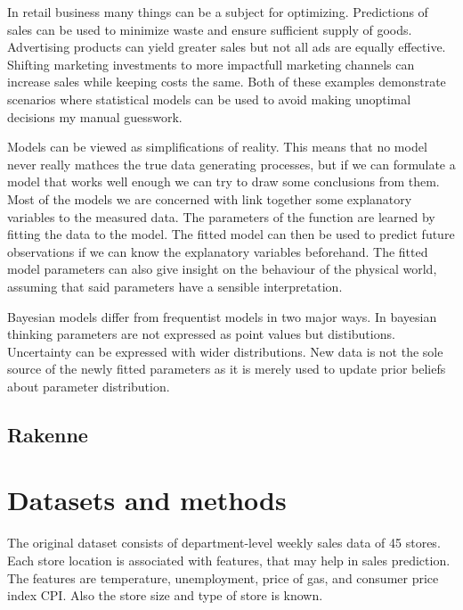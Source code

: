 \documentclass[english, 12pt, a4paper, sci, utf8, a-1b, online]{aaltothesis}
\begin{document}
In retail business many things can be a subject for optimizing. Predictions of sales can be used
to minimize waste and ensure sufficient supply of goods. Advertising products can yield greater sales
but not all ads are equally effective. Shifting marketing investments to more impactfull marketing channels
can increase sales while keeping costs the same. Both of these examples demonstrate scenarios where statistical models can be used to
avoid making unoptimal decisions my manual guesswork.

Models can be viewed as simplifications of reality. This means that no model never really mathces the true data generating processes, 
but if we can formulate a model that works well enough we can try to draw some conclusions from them. Most of the models we are concerned with
link together some explanatory variables to the measured data. The parameters of the function are learned by fitting the data to the model.
The fitted model can then be used to predict future observations if we can know the explanatory variables beforehand. The fitted model parameters
can also give insight on the behaviour of the physical world, assuming that said parameters have a sensible interpretation.

Bayesian models differ from frequentist models in two major ways. In bayesian thinking parameters are not expressed as point values but distibutions.
Uncertainty can be expressed with wider distributions. New data is not the sole source of the newly fitted parameters as it is merely used to
update prior beliefs about parameter distribution. 






\subsection{Rakenne}

\section{Datasets and methods}




The original dataset consists of department-level weekly sales data of 45 stores. Each store location is associated with features,
that may help in sales prediction. The features are temperature, unemployment, price of gas, and consumer price index CPI. Also the store size
and type of store is known.
\end{document}
